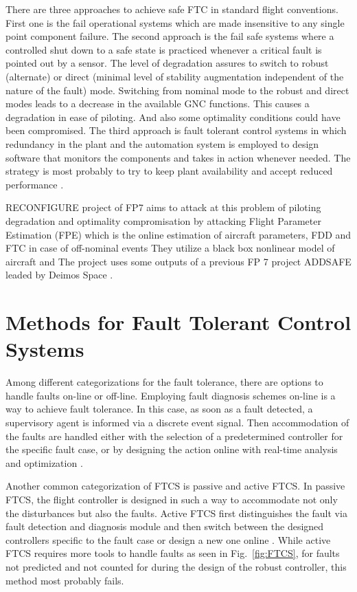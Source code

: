 There are three approaches to achieve safe FTC in standard flight conventions. 
First one is the fail operational systems which are made insensitive to any single 
point component failure. The second approach is the fail safe systems where a 
controlled shut down to a safe state is practiced whenever a critical fault is pointed 
out by a sensor. The level of degradation assures to switch to robust (alternate) or 
direct (minimal level of stability augmentation independent of the nature of the fault) mode. 
Switching from nominal mode to the robust and direct modes leads to a decrease 
in the available GNC functions. This causes a degradation in ease of piloting. And 
also some optimality conditions could have been compromised. The third approach 
is fault tolerant control systems in which redundancy in the plant and the automation 
system is employed to design software that monitors the components and takes in 
action whenever needed. The strategy is most probably to try to keep plant availability 
and accept reduced performance \cite{blanke2000fault}.

RECONFIGURE project of FP7 \cite{goupil2015overview} aims to attack at this 
problem of piloting degradation and optimality compromisation by attacking 
Flight Parameter Estimation (FPE) which is the online estimation of aircraft parameters, 
FDD and FTC in case of off-nominal events \cite{RECONFIGURE} They utilize a black 
box nonlinear model of aircraft and The project uses some outputs of a previous FP 7 
project ADDSAFE leaded by Deimos Space \cite{ADDSAFE}.

\section{Methods for Fault Tolerant Control Systems}\label{ch1:methodsFTCS}

Among different categorizations for the fault tolerance, there are options to handle 
faults on-line or off-line. Employing fault diagnosis schemes on-line is a way to 
achieve fault tolerance. In this case, as soon as a fault detected, a supervisory 
agent is informed via a discrete event signal. Then accommodation of the faults 
are handled either with the selection of a predetermined controller for the specific 
fault case, or by designing the action online with real-time analysis and optimization \cite{blanke2000fault}.

Another common categorization of FTCS is passive and active FTCS. In passive FTCS, 
the flight controller is designed in such a way to accommodate not only the 
disturbances but also the faults. Active FTCS first distinguishes the fault via fault detection 
and diagnosis module and then switch between the designed controllers specific to the 
fault case or design a new one online \cite{angelov2012sense}. While active FTCS 
requires more tools to handle faults as seen in Fig.~\ref{fig:FTCS}, for faults 
not predicted and not counted for during the design of the robust controller, this method 
most probably fails. 


